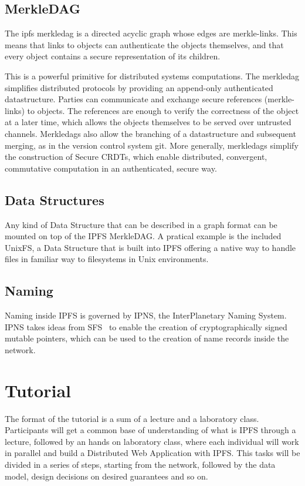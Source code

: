 \documentclass[runningheads,a4paper]{llncs}
\begin{document}
\subsection{MerkleDAG}

The ipfs merkledag is a directed acyclic graph whose edges are merkle-links. This means that links to objects can authenticate the objects themselves, and that every object contains a secure representation of its children.

This is a powerful primitive for distributed systems computations. The merkledag simplifies distributed protocols by providing an append-only authenticated datastructure. Parties can communicate and exchange secure references (merkle-links) to objects. The references are enough to verify the correctness of the object at a later time, which allows the objects themselves to be served over untrusted channels. Merkledags also allow the branching of a datastructure and subsequent merging, as in the version control system git. More generally, merkledags simplify the construction of Secure CRDTs, which enable distributed, convergent, commutative computation in an authenticated, secure way.

\subsection{Data Structures}

Any kind of Data Structure that can be described in a graph format can be mounted on top of the IPFS MerkleDAG\@. A pratical example is the included UnixFS, a Data Structure that is built into IPFS offering a native way to handle files in familiar way to filesystems in Unix environments.

\subsection{Naming}

Naming inside IPFS is governed by IPNS, the InterPlanetary Naming System. IPNS takes ideas from SFS~\cite{mazieres2000sfs} to enable the creation of cryptographically signed mutable pointers, which can be used to the creation of name records inside the network.


\section{Tutorial}\label{sec:tutorial}

The format of the tutorial is a sum of a lecture and a laboratory class. Participants will get a common base of understanding of what is IPFS through a lecture, followed by an hands on laboratory class, where each individual will work in parallel and build a Distributed Web Application with IPFS\@. This tasks will be divided in a series of steps, starting from the network, followed by the data model, design decisions on desired guarantees and so on.
\end{document}
